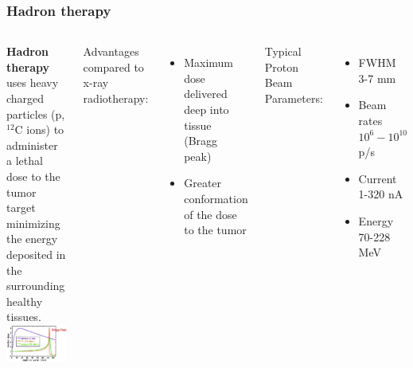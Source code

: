 \documentclass[aspectratio=169]{beamer}
\begin{document}
	\begin{frame}
	\frametitle{Hadron therapy}
		\begin{columns}
		\begin{center}
			\textbf{Hadron therapy} uses heavy charged particles (p, ${}^{12}$C ions) to administer a lethal dose to the tumor target minimizing the energy deposited in the surrounding healthy tissues.
			\includegraphics[width=0.95 \textwidth]{IMG/Bragg_Peak.PNG}
		\end{center}
		
			{\color{blue} Advantages compared to x-ray radiotherapy:}
			\begin{itemize}
				\item Maximum dose delivered deep into tissue (Bragg peak)
				\item Greater conformation of the dose to the tumor
			\end{itemize}
		\vspace{1 cm}
			{\color{blue} Typical Proton Beam Parameters:}
			\begin{itemize}
				\item FWHM 3-7 mm
				\item Beam rates $10^6-10^{10}$ p/s
				\item Current  1-320 nA
				\item Energy  70-228 MeV
			\end{itemize}
		
		\end{columns}
	\end{frame}
\end{document}
